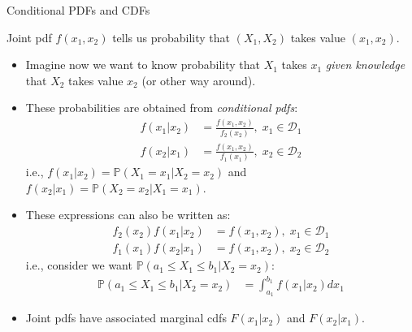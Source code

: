 \documentclass[9pt]{beamer}
\begin{document}
%
\begin{frame}{Conditional PDFs and CDFs}

Joint pdf $f(x_1,x_2)$ tells us probability that $(X_1,X_2)$ takes value $(x_1,x_2)$.

\begin{itemize}
\setlength{\itemsep}{5pt}
\item Imagine now we want to know probability that $X_1$ takes $x_1$ {\em given knowledge} that $X_2$ takes value $x_2$ (or other way around). 

\item These probabilities are obtained from {\em conditional pdfs}:
\begin{align*}
f(x_1|x_2)&=\frac{f(x_1,x_2)}{f_2(x_2)},\; x_1\in \mathcal{D}_1\\
f(x_2|x_1)&=\frac{f(x_1,x_2)}{f_1(x_1)},\; x_2\in \mathcal{D}_2
\end{align*}
i.e., $f(x_1|x_2)=\mathbb{P}(X_1=x_1|X_2=x_2)$ and $f(x_2|x_1)=\mathbb{P}(X_2=x_2|X_1=x_1)$.
\item These expressions can also be written as:
 \begin{align*}
{f_2(x_2)}f(x_1|x_2)&={f(x_1,x_2)},\; x_1\in \mathcal{D}_1\\
{f_1(x_1)}f(x_2|x_1)&={f(x_1,x_2)},\; x_2\in \mathcal{D}_2
\end{align*}
i.e., consider we want $\mathbb{P}(a_1\leq X_1\leq b_1|X_2=x_2)$:
\begin{align*}
\mathbb{P}(a_1\leq X_1\leq b_1|X_2=x_2)&=\int_{a_1}^{b_1}f(x_1|x_2)dx_1
\end{align*}

\item Joint pdfs have associated marginal cdfs $F(x_1|x_2)$ and $F(x_2|x_1)$. 

\end{itemize}

\end{frame}
\end{document}
